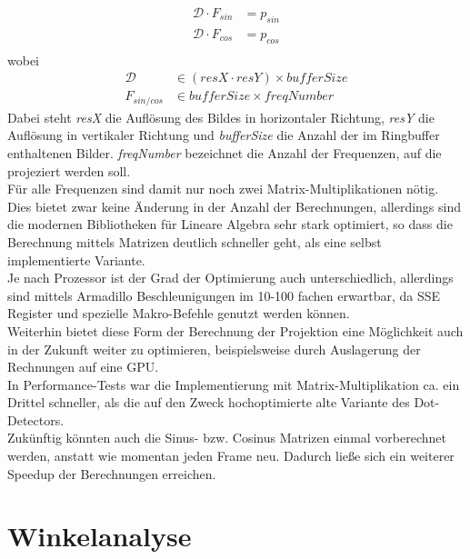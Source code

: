 \documentclass[11pt,a4paper]{article}
\begin{document}
\begin{align}
\mathcal{D} \cdot F_{sin} &= p_{sin} \\
\mathcal{D} \cdot F_{cos} &= p_{cos} \\
\end{align}
wobei
\begin{align*}
\mathcal{D} &\in (resX \cdot resY) \times bufferSize \\
F_{sin/cos} &\in bufferSize \times freqNumber
\end{align*}
Dabei steht \textit{resX} die Auflösung des Bildes in horizontaler Richtung, \textit{resY} die Auflösung in vertikaler Richtung und \textit{bufferSize} die Anzahl der im Ringbuffer enthaltenen Bilder. \textit{freqNumber} bezeichnet die Anzahl der Frequenzen, auf die projeziert werden soll.\\
Für alle Frequenzen sind damit nur noch zwei Matrix-Multiplikationen nötig. Dies bietet zwar keine Änderung in der Anzahl der Berechnungen, allerdings sind die modernen Bibliotheken für Lineare Algebra sehr stark optimiert, so dass die Berechnung mittels Matrizen deutlich schneller geht, als eine selbst implementierte Variante.\\
Je nach Prozessor ist der Grad der Optimierung auch unterschiedlich, allerdings sind mittels Armadillo Beschleunigungen im 10-100 fachen erwartbar, da SSE Register und spezielle Makro-Befehle genutzt werden können.\\
Weiterhin bietet diese Form der Berechnung der Projektion eine Möglichkeit auch in der Zukunft weiter zu optimieren, beispielsweise durch Auslagerung der Rechnungen auf eine GPU.\\
In Performance-Tests war die Implementierung mit Matrix-Multiplikation ca. ein Drittel schneller, als die auf den Zweck hochoptimierte alte Variante des Dot-Detectors.\\
Zukünftig könnten auch die Sinus- bzw. Cosinus Matrizen einmal vorberechnet werden, anstatt wie momentan jeden Frame neu. Dadurch ließe sich ein weiterer Speedup der Berechnungen erreichen.

\section{Winkelanalyse}
\end{document}
